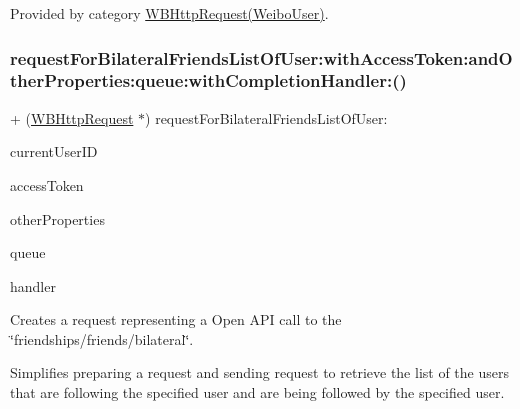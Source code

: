 Provided by category \mbox{\hyperlink{category_w_b_http_request_07_weibo_user_08_a8266e8e1c5230407f29ee63e05e98b38}{W\+B\+Http\+Request(\+Weibo\+User)}}.

\mbox{\label{interface_w_b_http_request_a8266e8e1c5230407f29ee63e05e98b38}} 
\subsubsection{\texorpdfstring{request\+For\+Bilateral\+Friends\+List\+Of\+User\+:with\+Access\+Token\+:and\+Other\+Properties\+:queue\+:with\+Completion\+Handler\+:()}{requestForBilateralFriendsListOfUser:withAccessToken:andOtherProperties:queue:withCompletionHandler:()}\hspace{0.1cm}{\footnotesize\ttfamily [3/3]}}
{\footnotesize\ttfamily + (\mbox{\hyperlink{interface_w_b_http_request}{W\+B\+Http\+Request}} $\ast$) request\+For\+Bilateral\+Friends\+List\+Of\+User\+: \begin{DoxyParamCaption}\item[{(N\+S\+String $\ast$)}]{current\+User\+ID }\item[{withAccessToken:(N\+S\+String $\ast$)}]{access\+Token }\item[{andOtherProperties:(N\+S\+Dictionary $\ast$)}]{other\+Properties }\item[{queue:(N\+S\+Operation\+Queue $\ast$)}]{queue }\item[{withCompletionHandler:(W\+B\+Request\+Handler)}]{handler }\end{DoxyParamCaption}}

Creates a request representing a Open A\+PI call to the \char`\"{}friendships/friends/bilateral\char`\"{}.

Simplifies preparing a request and sending request to retrieve the list of the users that are following the specified user and are being followed by the specified user.

